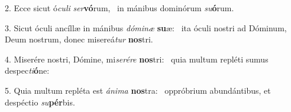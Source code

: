 2. Ecce sicut ó\textit{cu}\textit{li} \textit{ser}\textbf{vó}rum, \ast\  in mánibus dominórum \textit{su}\textbf{ó}rum.\

3. Sicut óculi ancíllæ in mánibus \textit{dó}\textit{mi}\textit{næ} \textbf{su}æ: \ast\  ita óculi nostri ad Dóminum, Deum nostrum, donec misereá\textit{tur} \textbf{nos}tri.\

4. Miserére nostri, Dómine, mi\textit{se}\textit{ré}\textit{re} \textbf{nos}tri: \ast\  quia multum repléti sumus despec\textit{ti}\textbf{ó}ne:\

5. Quia multum repléta est \textit{á}\textit{ni}\textit{ma} \textbf{nos}tra: \ast\  oppróbrium abundántibus, et despéctio \textit{su}\textbf{pér}bis.\

